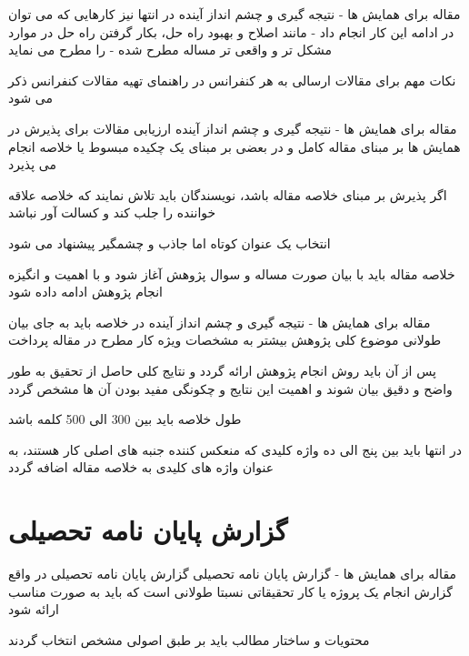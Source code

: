 \documentclass[14pt]{beamer}
\newcommand{\sectionfontsize}{\fontsize{22pt}{0pt}\selectfont}
\newcommand{\framefontsizelarge}{\fontsize{18pt}{0pt}\selectfont}
\newcommand{\frametitlefontsize}{\fontsize{20pt}{0pt}\selectfont}
\begin{document}
\begin{persian}
\begin{frame}[plain]{\frametitlefontsize مقاله برای همایش ها - نتیجه گیری و چشم انداز آینده}
		در انتها نیز کارهایی که می توان در ادامه این کار انجام داد - مانند اصلاح و بهبود راه حل، بکار گرفتن راه حل در موارد مشکل تر و واقعی تر مساله مطرح شده - را مطرح می نماید
		
		نکات مهم برای مقالات ارسالی به هر کنفرانس در راهنمای تهیه مقالات کنفرانس ذکر می شود
	\end{frame}	
	
	\begin{frame}[plain]{\frametitlefontsize مقاله برای همایش ها - نتیجه گیری و چشم انداز آینده}
		\framefontsizelarge
		ارزیابی مقالات برای پذیرش در همایش ها بر مبنای مقاله کامل و در بعضی بر مبنای یک چکیده مبسوط یا خلاصه انجام می پذیرد
		
		اگر پذیرش بر مبنای خلاصه مقاله باشد، نویسندگان باید تلاش نمایند که خلاصه علاقه خواننده را جلب کند و کسالت آور نباشد
		
		انتخاب یک عنوان کوتاه اما جاذب و چشمگیر پیشنهاد می شود
		
		خلاصه مقاله باید با بیان صورت مساله و سوال پژوهش آغاز شود و با اهمیت و انگیزه انجام پژوهش ادامه داده شود
	\end{frame}	
	
	\begin{frame}[plain]{\frametitlefontsize مقاله برای همایش ها - نتیجه گیری و چشم انداز آینده}
		\framefontsizelarge
		در خلاصه باید به جای بیان طولانی موضوع کلی پژوهش بیشتر به مشخصات ویژه کار مطرح در مقاله پرداخت
		
		پس از آن باید روش انجام پژوهش ارائه گردد و نتایج کلی حاصل از تحقیق به طور واضح و دقیق بیان شوند و اهمیت این نتایج و چکونگی مفید بودن آن ها مشخص گردد
		
		طول خلاصه باید بین 300 الی 500 کلمه باشد
		
		در انتها باید بین پنج الی ده واژه کلیدی که منعکس کننده جنبه های اصلی کار هستند، به عنوان واژه های کلیدی به خلاصه مقاله اضافه گردد
	\end{frame}	
	
		\section{\sectionfontsize گزارش پایان نامه تحصیلی}	
	
	\begin{frame}[plain]{\frametitlefontsize مقاله برای همایش ها - گزارش پایان نامه تحصیلی}
		\framefontsizelarge
		گزارش پایان نامه تحصیلی در واقع گزارش انجام یک پروژه یا کار تحقیقاتی نسبتا طولانی است که باید به صورت مناسب ارائه شود
		
		محتویات و ساختار مطالب باید بر طبق اصولی مشخص انتخاب گردند
		

\end{frame}
\end{persian}
\end{document}
